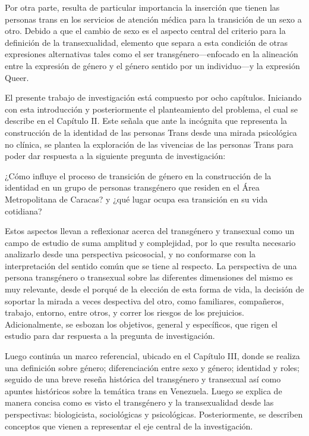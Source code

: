 Por otra parte, resulta de particular importancia la inserción que tienen las
personas trans en los servicios de atención médica para la transición de un sexo
a otro.
Debido a que el cambio de sexo es el aspecto central del criterio para la
definición de la transexualidad, elemento que separa a esta condición de otras
expresiones alternativas tales como el ser transgénero—enfocado en la
alineación entre la expresión de género y el género sentido por un individuo—y
la expresión Queer.

El presente trabajo de investigación está compuesto por ocho capítulos.
Iniciando con esta introducción y posteriormente el planteamiento del problema,
el cual se describe en el Capítulo II.
Este señala que ante la incógnita que representa la construcción de la identidad
de las personas Trans desde una mirada psicológica no clínica, se plantea la
exploración de las vivencias de las personas Trans para poder dar respuesta a la
siguiente pregunta de investigación:

¿Cómo influye el proceso de transición de género en la construcción de la
identidad en un grupo de personas transgénero que residen en el Área
Metropolitana de Caracas? y ¿qué lugar ocupa esa transición en su vida cotidiana?

Estos aspectos llevan a reflexionar acerca del transgénero y transexual como un
campo de estudio de suma amplitud y complejidad, por lo que resulta necesario
analizarlo desde una perspectiva psicosocial, y no conformarse con la
interpretación del sentido común que se tiene al respecto.
La perspectiva de una persona transgénero o transexual sobre las diferentes
dimensiones del mismo es muy relevante, desde el porqué de la elección de esta
forma de vida, la decisión de soportar la mirada a veces despectiva del otro,
como familiares, compañeros, trabajo, entorno, entre otros, y correr los
riesgos de los prejuicios.
Adicionalmente, se esbozan los objetivos, general y específicos, que rigen el
estudio para dar respuesta a la pregunta de investigación.

Luego continúa un marco referencial, ubicado en el Capítulo III, donde se
realiza una definición sobre género;
diferenciación entre sexo y género;
identidad y roles;
seguido de una breve reseña histórica del transgénero y transexual así como
apuntes históricos sobre la temática trans en Venezuela.
Luego se explica de manera concisa como es visto el transgénero y la
transexualidad desde las perspectivas: biologicista, sociológicas y
psicológicas.
Posteriormente, se describen conceptos que vienen a representar el eje central
de la investigación.

